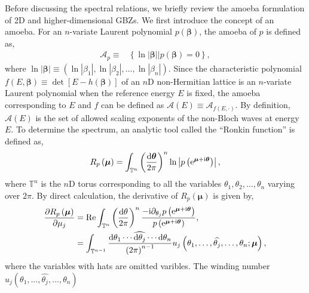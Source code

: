 Before discussing the spectral relations, we briefly review the amoeba
formulation of 2D and higher-dimensional GBZs. We first introduce
the concept of an amoeba. For an $n$-variate Laurent polynomial $p(\boldsymbol{\beta})$,
the amoeba of $p$ is defined as, 
\begin{align}
\mathcal{A}_{p}\equiv & \left\{ \ln\left|\boldsymbol{\beta}\right||p\left(\boldsymbol{\beta}\right)=0\right\} ,\label{eq:definition-Amoeba}
\end{align}
where $\ln\left|\boldsymbol{\beta}\right|\equiv\left(\ln\left|\beta_{1}\right|,\ln\left|\beta_{2}\right|,\dots,\ln\left|\beta_{n}\right|\right)$.
Since the characteristic polynomial $f(E,\boldsymbol{\beta})\equiv\det[E-h(\boldsymbol{\beta})]$
of an $n$D non-Hermitian lattice is an $n$-variate Laurent polynomial
when the reference energy $E$ is fixed, the amoeba corresponding
to $E$ and $f$ can be defined as $\mathcal{A}\left(E\right)\equiv\mathcal{A}_{f\left(E,\cdot\right)}$.
By definition, $\mathcal{A}\left(E\right)$ is the set of allowed
scaling exponents of the non-Bloch waves at energy $E$. To determine
the spectrum, an analytic tool called the ``Ronkin function'' is
defined as, 
\begin{equation}
R_{p}\left(\boldsymbol{\mu}\right)=\int_{\mathbb{T}^{n}}\left(\frac{\mathrm{d}\boldsymbol{\theta}}{2\pi}\right)^{n}\ln\left|p\left(\mathrm{e}^{\boldsymbol{\mu}+\mathrm{i}\boldsymbol{\theta}}\right)\right|,\label{eq:Ronkin-function}
\end{equation}
where $\mathbb{T}^{n}$ is the $n$D torus corresponding to all the
variables $\theta_{1},\theta_{2},\dots,\theta_{n}$ varying over $2\pi$.
By direct calculation, the derivative of $R_{p}\left(\boldsymbol{\mu}\right)$
is given by, 
\begin{align}
\frac{\partial R_{p}\left(\boldsymbol{\mu}\right)}{\partial\mu_{j}} & =\text{Re}\int_{\mathbb{T}^{n}}\left(\frac{\mathrm{d}\theta}{2\pi}\right)^{n}\frac{-\mathrm{i}\partial_{\theta_{j}}p\left(\mathrm{e}^{\boldsymbol{\mu}+\mathrm{i}\boldsymbol{\theta}}\right)}{p\left(\mathrm{e}^{\boldsymbol{\mu}+\mathrm{i}\boldsymbol{\theta}}\right)},\nonumber \\
 & =\int_{\mathbb{T}^{n-1}}\frac{\mathrm{d}\theta_{1}\cdots\widehat{\mathrm{d}\theta_{j}}\cdots\mathrm{d}\theta_{n}}{\left(2\pi\right)^{n-1}}u_{j}\left(\theta_{1},\dots,\widehat{\theta_{j}},\dots,\theta_{n};\boldsymbol{\mu}\right),\label{eq:derivative-Ronkin}
\end{align}
where the variables with hats are omitted varibles. The winding number
$u_{j}\left(\theta_{1},\dots,\widehat{\theta_{j}},\dots,\theta_{n}\right)$
